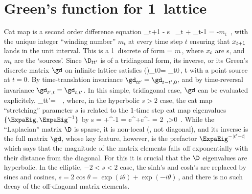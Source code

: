 
\section{Green's  function for 1\dmn\ lattice}
\label{sect:Green1d}

\renewcommand{\Ssym}[1]{{\ensuremath{m_{#1}}}}    %

Cat map is a second order difference equation
\beq
\ssp_{t+1}  -  s \, \ssp_{t} + \ssp_{t-1}
    =
-\Ssym{t}
\,,
with the unique integer ``winding number'' $\Ssym{t}$  at every time step $t$
ensuring that $x_{t+1}$ lands in the unit interval.
This is a 1\dmn\ discrete {\sPe} of form
\beq
 \D \ssp = \Ssym
\,,
where $x_t$ are {\lattstate}s, and $\Ssym{t}$ are the `sources'. Since
$\D_{tt'}$
is of a tridiagonal form,  its inverse, or its Green's
discrete matrix $\gd$ on infinite lattice satisfies
\beq
 (\D \gd)_{t0}= \delta_{t0}\,, \qquad t\in \integers
{}
with a point source at $t=0$.
By time-translation invariance $\gd_{tt'}=\gd_{t-t',0}$, and by time-reversal
invariance $\gd_{t',t}=\gd_{t,t'}$.
In this simple, tridiagonal case, $\gd$ can be evaluated
explicitely,
\beq
\gd_{tt'}= \,
\,,
where, in the hyperbolic $s>2$ case, the cat map ``stretching'' parameter
$s$ is related to the 1-time step cat map eigenvalues
$\{\ExpaEig,\ExpaEig^{-1}\}$ by
\beq
s
  = \ExpaEig+\ExpaEig^{-1}
  = e^\Lyap+e^{-\Lyap}
  = 2\cosh\Lyap
\,,\quad \Lyap>0
\,.
While the ``Laplacian'' matrix $\D$ is sparse, it is non-local (\ie, not
diagonal), and its inverse is the full matrix $\gd$, whose key feature,
however, is the prefactor $\ExpaEig^{-|t'-t|}$ which says that the magnitude of
the matrix elements falls off exponentially with their distance from the
diagonal. For this it is crucial that the $\D$ eigenvalues 
are hyperbolic. In the elliptic, $-2<s<2$ case, the sinh's and cosh's are
replaced by sines and cosines,
\(
  s= 2\cos\theta= \exp(i\theta)+\exp(-i\theta)
\)\,,
and there is no such decay of the off-diagonal matrix elements.

